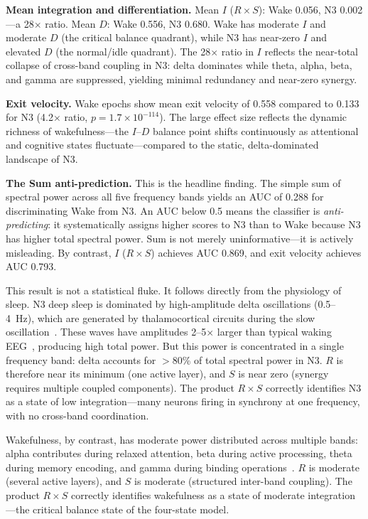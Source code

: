 \documentclass[aip,cha,reprint,amsmath,amssymb]{revtex4-2}
\begin{document}
\textbf{Mean integration and differentiation.} Mean $I$ ($R \times S$): Wake 0.056, N3 0.002---a 28$\times$ ratio. Mean $D$: Wake 0.556, N3 0.680. Wake has moderate $I$ and moderate $D$ (the critical balance quadrant), while N3 has near-zero $I$ and elevated $D$ (the normal/idle quadrant). The 28$\times$ ratio in $I$ reflects the near-total collapse of cross-band coupling in N3: delta dominates while theta, alpha, beta, and gamma are suppressed, yielding minimal redundancy and near-zero synergy.

\textbf{Exit velocity.} Wake epochs show mean exit velocity of 0.558 compared to 0.133 for N3 (4.2$\times$ ratio, $p = 1.7 \times 10^{-114}$). The large effect size reflects the dynamic richness of wakefulness---the $I$--$D$ balance point shifts continuously as attentional and cognitive states fluctuate---compared to the static, delta-dominated landscape of N3.

\textbf{The Sum anti-prediction.} This is the headline finding. The simple sum of spectral power across all five frequency bands yields an AUC of 0.288 for discriminating Wake from N3. An AUC below 0.5 means the classifier is \emph{anti-predicting}: it systematically assigns higher scores to N3 than to Wake because N3 has higher total spectral power. Sum is not merely uninformative---it is actively misleading. By contrast, $I$ ($R \times S$) achieves AUC 0.869, and exit velocity achieves AUC 0.793.

This result is not a statistical fluke. It follows directly from the physiology of sleep. N3 deep sleep is dominated by high-amplitude delta oscillations (0.5--4~Hz), which are generated by thalamocortical circuits during the slow oscillation~\cite{massimini2005}. These waves have amplitudes 2--5$\times$ larger than typical waking EEG~\cite{niedermeyer2005}, producing high total power. But this power is concentrated in a single frequency band: delta accounts for $>$80\% of total spectral power in N3. $R$ is therefore near its minimum (one active layer), and $S$ is near zero (synergy requires multiple coupled components). The product $R \times S$ correctly identifies N3 as a state of low integration---many neurons firing in synchrony at one frequency, with no cross-band coordination.

Wakefulness, by contrast, has moderate power distributed across multiple bands: alpha contributes during relaxed attention, beta during active processing, theta during memory encoding, and gamma during binding operations~\cite{buzsaki2006}. $R$ is moderate (several active layers), and $S$ is moderate (structured inter-band coupling). The product $R \times S$ correctly identifies wakefulness as a state of moderate integration---the critical balance state of the four-state model.
\end{document}

